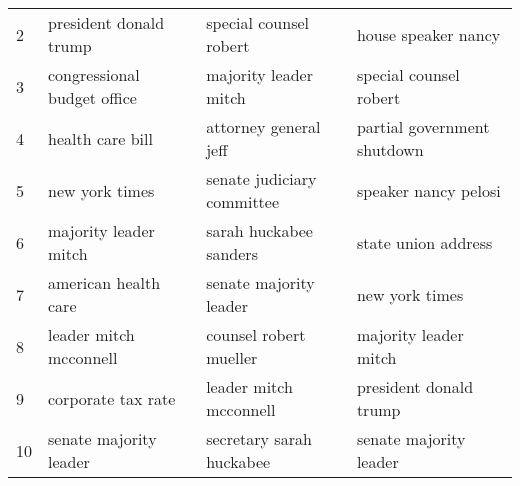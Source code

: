 \begin{table}[]
\begin{tabular}{l||l|l|l}
    2   & president donald trump      & special counsel robert     & house speaker nancy         \\ 
    3   & congressional budget office & majority leader mitch      & special counsel robert      \\
    4   & health care bill            & attorney general jeff      & partial government shutdown \\
    5   & new york times              & senate judiciary committee & speaker nancy pelosi        \\
    6   & majority leader mitch       & sarah huckabee sanders     & state union address         \\
    7   & american health care        & senate majority leader     & new york times              \\
    8   & leader mitch mcconnell      & counsel robert mueller     & majority leader mitch       \\
    9   & corporate tax rate          & leader mitch mcconnell     & president donald trump      \\
    10  & senate majority leader      & secretary sarah huckabee   & senate majority leader      \\ \hline

    \end{tabular}
\end{table}